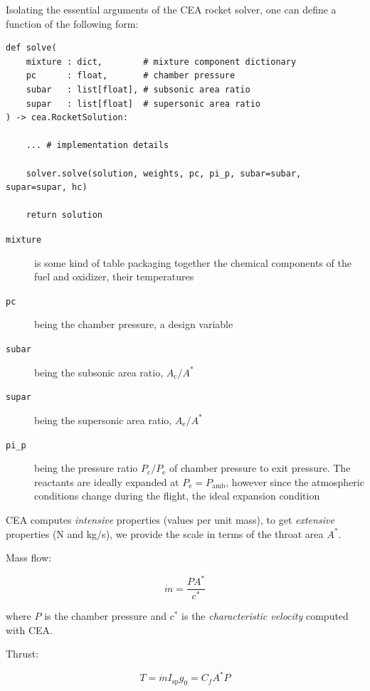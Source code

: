 \documentclass[fleqn]{article}
\begin{document}
Isolating the essential arguments of the CEA rocket solver, one can define a
function of the following form:

\begin{verbatim}
def solve(
    mixture : dict,        # mixture component dictionary
    pc      : float,       # chamber pressure
    subar   : list[float], # subsonic area ratio
    supar   : list[float]  # supersonic area ratio
) -> cea.RocketSolution:

    ... # implementation details

    solver.solve(solution, weights, pc, pi_p, subar=subar, supar=supar, hc)

    return solution
\end{verbatim}

\begin{description}
\item[{\texttt{mixture}}] is some kind of table packaging together the chemical components
of the fuel and oxidizer, their temperatures

\item[{\texttt{pc}}] being the chamber pressure, a design variable

\item[{\texttt{subar}}] being the subsonic area ratio, \(A_\text{c}/A^*\)

\item[{\texttt{supar}}] being the supersonic area ratio, \(A_\text{e}/A^*\)

\item[{\texttt{pi\_p}}] being the pressure ratio \(P_\text{c}/P_\text{e}\) of chamber pressure
to exit pressure. The reactants are ideally expanded at \(P_\text{e} =
  P_\text{amb}\), however since the atmospheric conditions change during the
flight, the ideal expansion condition
\end{description}

CEA computes \emph{intensive} properties (values per unit mass), to get \emph{extensive}
properties (N and kg/s), we provide the scale in terms of the throat area \(A^*\).

Mass flow:

\begin{equation*}
\dot{m} = \frac{P A^*}{c^*}
\end{equation*}

where \(P\) is the chamber pressure and \(c^*\) is the \emph{characteristic velocity}
computed with CEA.

Thrust:

\begin{equation*}
T
= \dot{m} I_\text{sp} g_0
= C_f A^* P
\end{equation*}
\end{document}

